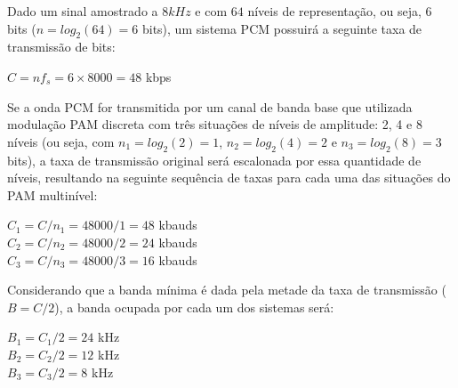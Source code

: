 Dado um sinal amostrado a $8 kHz$ e com $64$ níveis de representação, ou seja, $6$ bits ($n = log_2(64) = 6$ bits), um sistema PCM possuirá a seguinte taxa de transmissão de bits:
\begin{center}
    $C = nf_s = 6 \times 8000 = 48$ kbps
\end{center}
Se a onda PCM for transmitida por um canal de banda base que utilizada modulação PAM discreta com três situações de níveis de amplitude: 2, 4 e 8 níveis (ou seja, com $n_1=log_2(2)=1$, $n_2=log_2(4)=2$ e $n_3=log_2(8)=3$ bits), a taxa de transmissão original será escalonada por essa quantidade de níveis, resultando na seguinte sequência de taxas para cada uma das situações do PAM multinível: 
\begin{center}
    $C_1 = C/n_1 = 48000 / 1 = 48$ kbauds \\ \vspace{1pt}
    $C_2 = C/n_2 = 48000 / 2 = 24$ kbauds \\ \vspace{1pt}
    $C_3 = C/n_3 = 48000 / 3 = 16$ kbauds 
\end{center}
Considerando que a banda mínima é dada pela metade da taxa de transmissão ($B=C/2$), a banda ocupada por cada um dos sistemas será:

\begin{center}
    $B_1 = C_1/2 = 24$ kHz \\ \vspace{1pt}
    $B_2 = C_2/2 = 12$ kHz \\ \vspace{1pt}
    $B_3 = C_3/2 = 8$ kHz 
\end{center}
\newpage